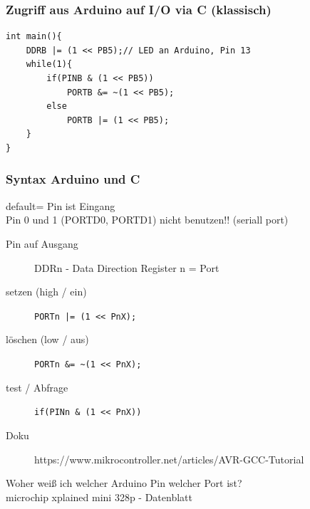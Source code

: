 \documentclass[aspectratio=169]{beamer}
\begin{document}
\begin{frame}[fragile]
    \frametitle{Zugriff aus Arduino auf I/O via C (klassisch)}
    \begin{lstlisting}
int main(){
    DDRB |= (1 << PB5);// LED an Arduino, Pin 13
    while(1){
        if(PINB & (1 << PB5))
            PORTB &= ~(1 << PB5);
        else
            PORTB |= (1 << PB5);
    }
}    
    \end{lstlisting}
\end{frame}

\begin{frame}[fragile]
    \frametitle{Syntax Arduino und C}
    default= Pin ist Eingang\\
    Pin 0 und 1 (PORTD0, PORTD1) nicht benutzen!! (seriall port)
    \pause
\begin{description}
    \item[Pin auf Ausgang] DDRn - Data Direction Register n = Port 
    \item[setzen (high / ein)] \lstinline!PORTn |= (1 << PnX);!
    \item[löschen (low / aus)] \lstinline!PORTn &= ~(1 << PnX);!
    \item[test / Abfrage] \lstinline!if(PINn & (1 << PnX))!
    \item[Doku] https://www.mikrocontroller.net/articles/AVR-GCC-Tutorial
\end{description}
Woher weiß ich welcher Arduino Pin welcher Port ist?\\
microchip xplained mini 328p - Datenblatt
\end{frame}
\end{document}
